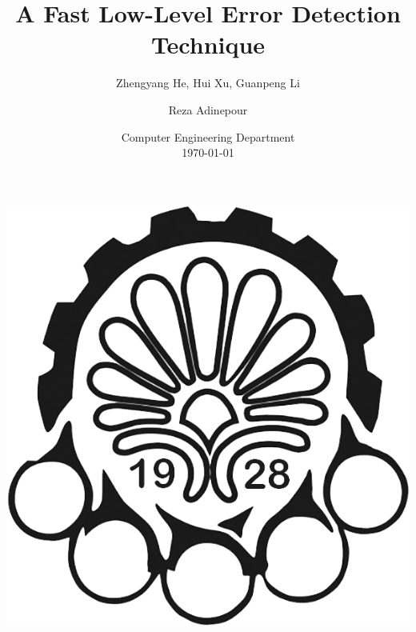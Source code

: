 \documentclass[
	12pt, %
]{beamer}
\title[A Fast Low-Level Error Detection Technique]{A Fast Low-Level Error Detection Technique} %
\subtitle{Zhengyang He, Hui Xu, Guanpeng Li} %
\author[Reza Adinepour]{Reza Adinepour} %
\institute[AUT]{Amirkabir University of Technology\\ (Tehran Polytechnic) \\ \smallskip } %
\date[\today]{Computer Engineering Department \\ \today} %
\begin{document}

\begin{frame}
	\titlepage %
	\centering\includegraphics[scale=0.15]{Images/Logo/logo2.png}
\end{frame}


\end{document}
